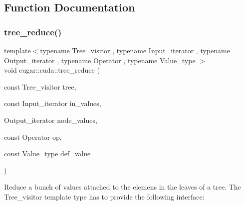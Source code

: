 \subsection{Function Documentation}
\mbox{\label{group___trees_module_ga8044d04a72e3a0a2bf628bbfc237f954}} 
\subsubsection{\texorpdfstring{tree\+\_\+reduce()}{tree\_reduce()}\hspace{0.1cm}{\footnotesize\ttfamily [1/4]}}
{\footnotesize\ttfamily template$<$typename Tree\+\_\+visitor , typename Input\+\_\+iterator , typename Output\+\_\+iterator , typename Operator , typename Value\+\_\+type $>$ \\
void cugar\+::cuda\+::tree\+\_\+reduce (\begin{DoxyParamCaption}\item[{const Tree\+\_\+visitor}]{tree,  }\item[{const Input\+\_\+iterator}]{in\+\_\+values,  }\item[{Output\+\_\+iterator}]{node\+\_\+values,  }\item[{const Operator}]{op,  }\item[{const Value\+\_\+type}]{def\+\_\+value }\end{DoxyParamCaption})}

Reduce a bunch of values attached to the elemens in the leaves of a tree. The Tree\+\_\+visitor template type has to provide the following interface\+:


